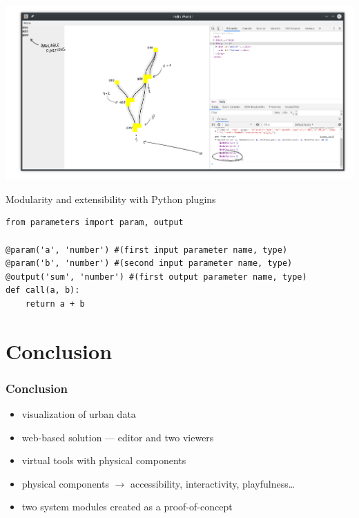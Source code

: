 \documentclass[czech,xcolor={table}]{beamer}
\begin{document}
	\begin{frame}
		\frametitle{}
		\begin{center}
			\includegraphics[width=1\textwidth]{imgs/editorDemo2.pdf}
		\end{center}
	\end{frame}

	\begin{frame}[fragile]
		Modularity and extensibility with Python plugins
		\begin{overprint}
			
		\begin{verbatim}
from parameters import param, output

@param('a', 'number') #(first input parameter name, type)
@param('b', 'number') #(second input parameter name, type)
@output('sum', 'number') #(first output parameter name, type)
def call(a, b):
    return a + b
		\end{verbatim}
		\end{overprint}
	\end{frame}

	\section{Conclusion}
	\begin{frame}
		\frametitle{Conclusion}
		\begin{itemize}
			\item visualization of urban data
			\item web-based solution --- editor and two viewers
			\item virtual tools with physical components
			\item physical components $\rightarrow$ accessibility, interactivity, playfulness\ldots
			\item two system modules created as a proof-of-concept 
		\end{itemize}
	\end{frame}
\end{document}
